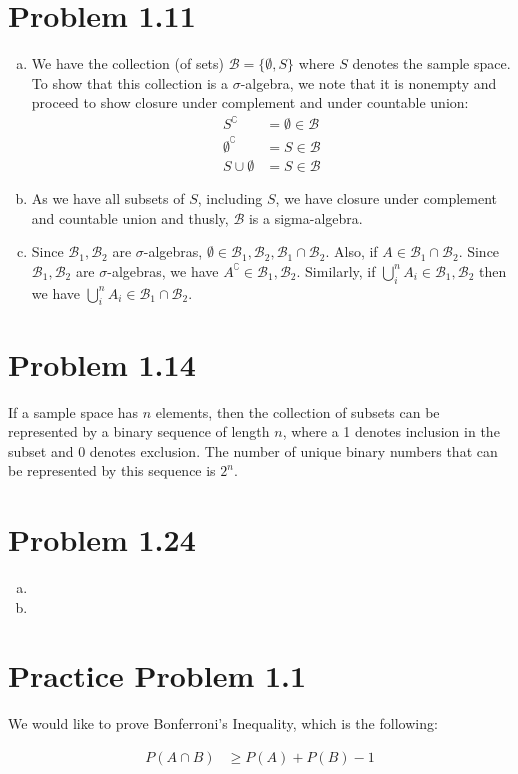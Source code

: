 \documentclass[11pt]{article}
\begin{document}
\section*{Problem 1.11}

\begin{enumerate}[(a)]
    \item We have the collection (of sets) $\mathcal{B} = \{\emptyset, S\}$ where $S$ denotes the sample space.  To show that this collection is a $\sigma$-algebra, we note that it is nonempty and proceed to show closure under complement and under countable union:
        \begin{align*}
            S^{\complement} &= \emptyset \in \mathcal{B} \\
            \emptyset^{\complement} &= S \in \mathcal{B} \\
            S \cup \emptyset &= S \in \mathcal{B}
        \end{align*}
    \item As we have all subsets of $S$, including $S$, we have closure under complement and countable union and thusly, $\mathcal{B}$ is a sigma-algebra.
    \item Since $\mathcal{B}_1, \mathcal{B}_2$ are $\sigma$-algebras, $\emptyset \in \mathcal{B}_1, \mathcal{B}_2, \mathcal{B}_1 \cap \mathcal{B}_2$.  Also, if $A \in \mathcal{B}_1 \cap \mathcal{B}_2$.  Since $\mathcal{B}_1, \mathcal{B}_2$ are $\sigma$-algebras, we have $A^{\complement} \in \mathcal{B}_1, \mathcal{B}_2$.  Similarly, if $\bigcup_i^n A_i \in \mathcal{B}_1, \mathcal{B}_2$ then we have $\bigcup_i^n A_i \in \mathcal{B}_1 \cap \mathcal{B}_2$.
\end{enumerate}

\section*{Problem 1.14}

If a sample space has $n$ elements, then the collection of subsets can be represented by a binary sequence of length $n$, where a 1 denotes inclusion in the subset and 0 denotes exclusion.  The number of unique binary numbers that can be represented by this sequence is $2^n$.

\section*{Problem 1.24}

\begin{enumerate}[(a)]
    \item 
    \item 
\end{enumerate}

\section*{Practice Problem 1.1}

We would like to prove Bonferroni's Inequality, which is the following:

\begin{align*}
    P(A \cap B) &\ge P(A) + P(B) - 1
\end{align*}
\end{document}
